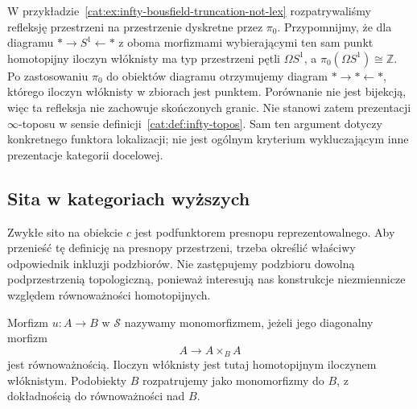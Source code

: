 \begin{przyklad}\label{cat:ex:infty-topos-truncation-localization}
W przykładzie~\ref{cat:ex:infty-bousfield-truncation-not-lex} rozpatrywaliśmy refleksję przestrzeni na przestrzenie dyskretne przez $\pi_0$. Przypomnijmy, że dla diagramu $*\to S^1\leftarrow *$ z oboma morfizmami wybierającymi ten sam punkt homotopijny iloczyn włóknisty ma typ przestrzeni pętli $\Omega S^1$, a $\pi_0(\Omega S^1)\cong\mathbb Z$. Po zastosowaniu $\pi_0$ do obiektów diagramu otrzymujemy diagram $*\to *\leftarrow *$, którego iloczyn włóknisty w zbiorach jest punktem. Porównanie nie jest bijekcją, więc ta refleksja nie zachowuje skończonych granic. Nie stanowi zatem prezentacji $\infty$-toposu w sensie definicji~\ref{cat:def:infty-topos}. Sam ten argument dotyczy konkretnego funktora lokalizacji; nie jest ogólnym kryterium wykluczającym inne prezentacje kategorii docelowej.
\end{przyklad}

\subsection{Sita w kategoriach wyższych}

Zwykłe sito na obiekcie $c$ jest podfunktorem presnopu reprezentowalnego. Aby przenieść tę definicję na presnopy przestrzeni, trzeba określić właściwy odpowiednik inkluzji podzbiorów. Nie zastępujemy podzbioru dowolną podprzestrzenią topologiczną, ponieważ interesują nas konstrukcje niezmiennicze względem równoważności homotopijnych.

\begin{definicja}\label{cat:def:infty-space-monomorphism}
Morfizm $u:A\to B$ w $\mathcal S$ nazywamy monomorfizmem, jeżeli jego diagonalny morfizm
\[
 A\longrightarrow A\times_B A
\]
jest równoważnością. Iloczyn włóknisty jest tutaj homotopijnym iloczynem włóknistym. Podobiekty $B$ rozpatrujemy jako monomorfizmy do $B$, z dokładnością do równoważności nad $B$.
\end{definicja}

